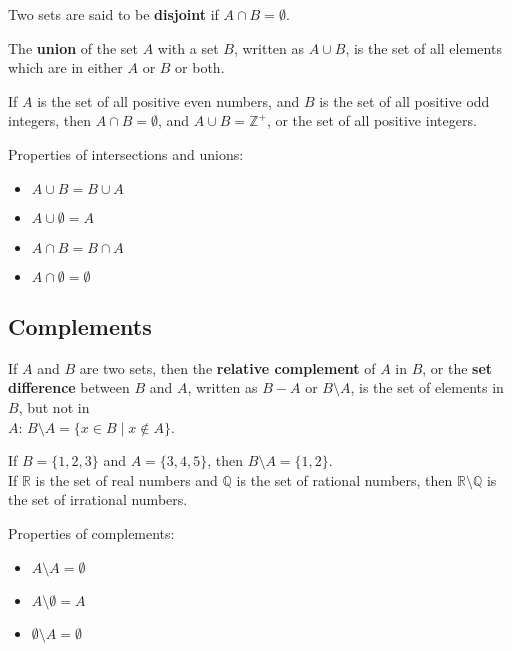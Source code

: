 \documentclass[12pt,a4paper]{article}
\begin{document}
\bigbreak

Two sets are said to be \textbf{disjoint} if $A\cap B=\emptyset$.

\bigbreak

The \textbf{union} of the set $A$ with a set $B$, written as $A\cup B$, is the set of all elements which are in either $A$ or $B$ or both.

\bigbreak

If $A$ is the set of all positive even numbers, and $B$ is the set of all positive odd integers, then $A\cap B=\emptyset$, and $A\cup B=\mathbb{Z}^{+}$, or the set of all positive integers.

\bigbreak

Properties of intersections and unions:
\begin{itemize}
	\item $A\cup B=B\cup A$
	\item $A\cup \emptyset=A$
	\item $A\cap B = B\cap A$
	\item $A\cap \emptyset = \emptyset$
\end{itemize}

\subsection*{Complements}
If $A$ and $B$ are two sets, then the \textbf{relative complement} of $A$ in $B$, or the \textbf{set difference} between $B$ and $A$, written as $B-A$ or $B\setminus A$, is the set of elements in $B$, but not in\\
$A$: $B\setminus A=\{x\in B \mid x \notin A\}$.

\bigbreak

If $B=\{1, 2, 3\}$ and $A=\{3, 4, 5\}$, then $B\setminus A=\{1,2\}$. \\
If $\mathbb{R}$ is the set of real numbers and $\mathbb{Q}$ is the set of rational numbers, then $\mathbb{R}\setminus\mathbb{Q}$ is the set of irrational numbers.

\bigbreak

Properties of complements:
\begin{itemize}
	\item $A\setminus A=\emptyset$
	\item $A\setminus \emptyset=A$
	\item $\emptyset\setminus A=\emptyset$
\end{itemize}

\newpage
\end{document}
